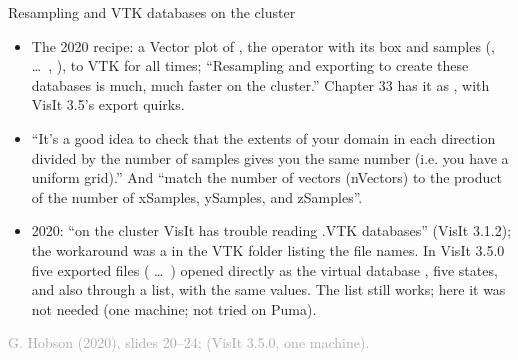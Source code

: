 \documentclass[aspectratio=169,11pt]{beamer}
\newcommand{\sourcecredit}[1]{\vfill\begin{flushright}\tiny\textcolor{DarkGray}{#1}\end{flushright}}
\begin{document}
\begin{frame}{Resampling and VTK databases on the cluster}
\label{fr:vtk}
\footnotesize
\begin{itemize}\setlength{\itemsep}{1pt}
  \item The 2020 recipe: a Vector plot of , the  operator with its box and samples (,  \dots\ , ),  to VTK for all times; ``Resampling and exporting to create these databases is much, much faster on the cluster.'' Chapter 33 has it as , with VisIt 3.5's export quirks.
  \item ``It's a good idea to check that the extents of your domain in each direction divided by the number of samples gives you the same number (i.e. you have a uniform grid).'' And ``match the number of vectors (nVectors) to the product of the number of xSamples, ySamples, and zSamples''.
  \item 2020: ``on the cluster VisIt has trouble reading .VTK databases'' (VisIt 3.1.2); the workaround was a  in the VTK folder listing the file names. In VisIt 3.5.0 five exported files ( \dots\ ) opened directly as the virtual database , five states, and also through a  list, with the same values. The list still works; here it was not needed (one machine; not tried on Puma).
\end{itemize}
\sourcecredit{G. Hobson (2020), slides 20--24; \code{wsl/final/ch31\_vtkseries.sh} (VisIt 3.5.0, one machine).}
\end{frame}
\end{document}
